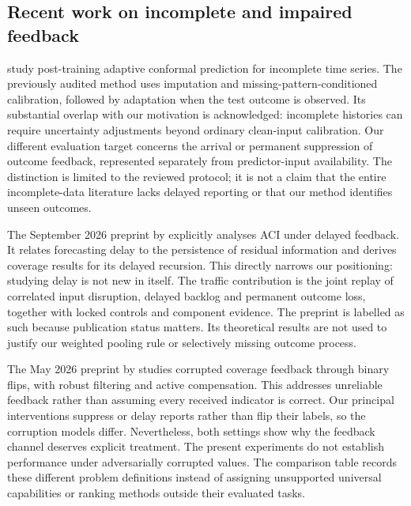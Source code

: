 \subsection{Recent work on incomplete and impaired feedback}
\citet{chen2026} study post-training adaptive conformal prediction for incomplete time series. The previously audited method uses imputation and missing-pattern-conditioned calibration, followed by adaptation when the test outcome is observed. Its substantial overlap with our motivation is acknowledged: incomplete histories can require uncertainty adjustments beyond ordinary clean-input calibration. Our different evaluation target concerns the arrival or permanent suppression of outcome feedback, represented separately from predictor-input availability. The distinction is limited to the reviewed protocol; it is not a claim that the entire incomplete-data literature lacks delayed reporting or that our method identifies unseen outcomes.

The September 2026 preprint by \citet{elhalabi2026} explicitly analyses ACI under delayed feedback. It relates forecasting delay to the persistence of residual information and derives coverage results for its delayed recursion. This directly narrows our positioning: studying delay is not new in itself. The traffic contribution is the joint replay of correlated input disruption, delayed backlog and permanent outcome loss, together with locked controls and component evidence. The preprint is labelled as such because publication status matters. Its theoretical results are not used to justify our weighted pooling rule or selectively missing outcome process.

The May 2026 preprint by \citet{wang2026} studies corrupted coverage feedback through binary flips, with robust filtering and active compensation. This addresses unreliable feedback rather than assuming every received indicator is correct. Our principal interventions suppress or delay reports rather than flip their labels, so the corruption models differ. Nevertheless, both settings show why the feedback channel deserves explicit treatment. The present experiments do not establish performance under adversarially corrupted values. The comparison table records these different problem definitions instead of assigning unsupported universal capabilities or ranking methods outside their evaluated tasks.

